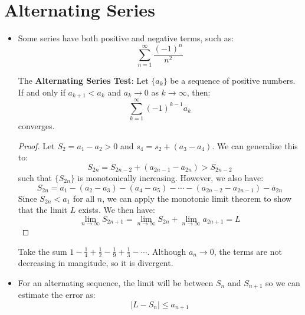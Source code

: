 \section{Alternating Series}
\begin{itemize}
    \item Some series have both positive and negative terms, such as:
    \begin{equation}
        \sum_{n=1}^\infty \frac{(-1)^n}{n^2}
    \end{equation}
    \begin{theorem}
        The \textbf{Alternating Series Test}: Let $\{a_k\}$ be a sequence of positive numbers. If and only if $a_{k+1}<a_k$ and $a_k \to 0$ as $k \to \infty$, then:
        \begin{equation}
            \sum_{k=1}^\infty (-1)^{k-1} a_k
        \end{equation}
        converges.
        \begin{proof}
            Let $S_2=a_1-a_2>0$ and $s_4=s_2+(a_3-a_4)$. We can generalize this to:
            \begin{equation}
                S_{2n} = S_{2n-2}+(a_{2n-1}-a_{2n}) > S_{2n-2}
            \end{equation}
            such that $\{S_{2n}\}$ is monotonically increasing. However, we also have:
            \begin{equation}
                S_{2n}=a_1-(a_2-a_3)-(a_4-a_5)-\cdots - (a_{2n-2}-a_{2n-1})-a_{2n}
            \end{equation}
            Since $S_{2n}<a_1$ for all $n$, we can apply the monotonic limit theorem to show that the limit $L$ exists. We then have:
            \begin{equation}
                \lim_{n\to\infty}S_{2n+1} = \lim_{n\to\infty}S_{2n}+\lim_{n\to\infty}a_{2n+1}=L
            \end{equation}
        \end{proof}
    \end{theorem}
    \begin{example}
        Take the sum $1-\frac{1}{4}+\frac{1}{2}-\frac{1}{9}+\frac{1}{3}-\cdots$. Although $a_n \to 0$, the terms are not decreasing in mangitude, so it is divergent.
    \end{example}
    \item For an alternating sequence, the limit will be between $S_n$ and $S_{n+1}$ so we can estimate the error as:
    \begin{equation}
        |L-S_n| \le a_{n+1}

\end{equation}
\end{itemize}
